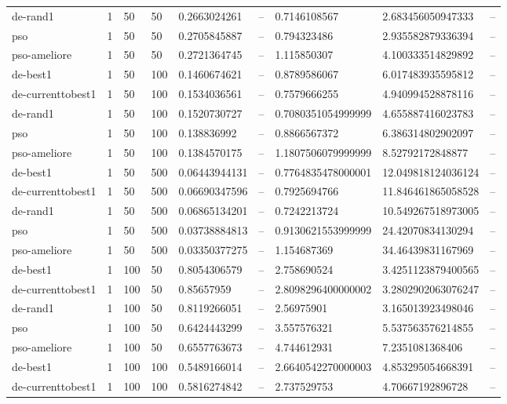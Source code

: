\begin{table}[t]
\begin{tabular}{lllllllll}
de-rand1 & 1 & 50 & 50 & 0.2663024261 & -- & 0.7146108567 & 2.683456050947333 & -- \\
pso & 1 & 50 & 50 & 0.2705845887 & -- & 0.794323486 & 2.935582879336394 & -- \\
pso-ameliore & 1 & 50 & 50 & 0.2721364745 & -- & 1.115850307 & 4.100333514829892 & -- \\
de-best1 & 1 & 50 & 100 & 0.1460674621 & -- & 0.8789586067 & 6.017483935595812 & -- \\
de-currenttobest1 & 1 & 50 & 100 & 0.1534036561 & -- & 0.7579666255 & 4.940994528878116 & -- \\
de-rand1 & 1 & 50 & 100 & 0.1520730727 & -- & 0.7080351054999999 & 4.655887416023783 & -- \\
pso & 1 & 50 & 100 & 0.138836992 & -- & 0.8866567372 & 6.386314802902097 & -- \\
pso-ameliore & 1 & 50 & 100 & 0.1384570175 & -- & 1.1807506079999999 & 8.52792172848877 & -- \\
de-best1 & 1 & 50 & 500 & 0.06443944131 & -- & 0.7764835478000001 & 12.049818124036124 & -- \\
de-currenttobest1 & 1 & 50 & 500 & 0.06690347596 & -- & 0.7925694766 & 11.846461865058528 & -- \\
de-rand1 & 1 & 50 & 500 & 0.06865134201 & -- & 0.7242213724 & 10.549267518973005 & -- \\
pso & 1 & 50 & 500 & 0.03738884813 & -- & 0.9130621553999999 & 24.42070834130294 & -- \\
pso-ameliore & 1 & 50 & 500 & 0.03350377275 & -- & 1.154687369 & 34.46439831167969 & -- \\
de-best1 & 1 & 100 & 50 & 0.8054306579 & -- & 2.758690524 & 3.4251123879400565 & -- \\
de-currenttobest1 & 1 & 100 & 50 & 0.85657959 & -- & 2.8098296400000002 & 3.2802902063076247 & -- \\
de-rand1 & 1 & 100 & 50 & 0.8119266051 & -- & 2.56975901 & 3.165013923498046 & -- \\
pso & 1 & 100 & 50 & 0.6424443299 & -- & 3.557576321 & 5.537563576214855 & -- \\
pso-ameliore & 1 & 100 & 50 & 0.6557763673 & -- & 4.744612931 & 7.2351081368406 & -- \\
de-best1 & 1 & 100 & 100 & 0.5489166014 & -- & 2.6640542270000003 & 4.853295054668391 & -- \\
de-currenttobest1 & 1 & 100 & 100 & 0.5816274842 & -- & 2.737529753 & 4.70667192896728 & -- \\

\end{tabular}
\end{table}
